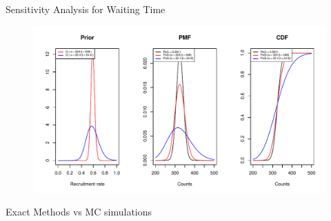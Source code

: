\documentclass[english]{beamer}\usepackage[]{graphicx}\usepackage[]{xcolor}
\makeatletter
\def\maxwidth{ %
  \ifdim\Gin@nat@width>\linewidth
    \linewidth
  \else
    \Gin@nat@width
  \fi
}
\newenvironment{knitrout}{}{} %
\makeatother
\begin{document}
\begin{frame}{Sensitivity Analysis for Waiting Time}

\begin{figure}
\centering
\begin{knitrout}
\color{fgcolor}
\includegraphics[width=\maxwidth]{figures/figunnamed-chunk-12-1} 
\end{knitrout}
\end{figure}
\end{frame}

\begin{frame}{Exact Methods vs MC simulations}

\end{frame}
\end{document}
